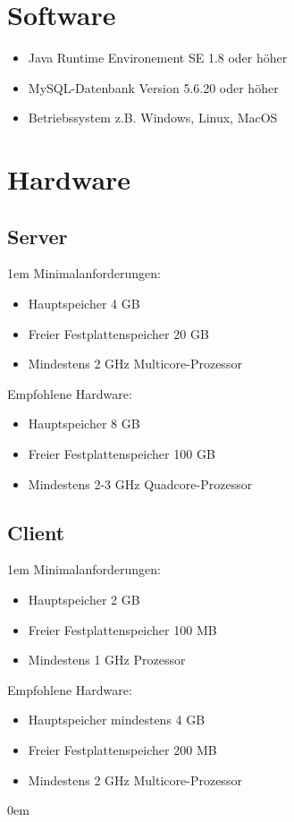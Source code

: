 \section{Software}
   \begin{itemize}
      \item Java Runtime Environement SE 1.8 oder höher
      \item MySQL-Datenbank Version 5.6.20 oder höher
      \item Betriebssystem z.B. Windows, Linux, MacOS
   \end{itemize}
\section{Hardware}
\label{sec:empfohleneHardware}
   \subsection{Server}\label{subsec:hardwareServer}
   \leftskip1em
	Minimalanforderungen:
   \begin{itemize}
   	\leftskip1em
      \item Hauptspeicher 4 GB
      \item Freier Festplattenspeicher 20 GB
      \item Mindestens 2 GHz Multicore-Prozessor
   \end{itemize}
   Empfohlene Hardware:
   \begin{itemize}
   \leftskip1em
      \item Hauptspeicher 8 GB
      \item Freier Festplattenspeicher 100 GB
      \item Mindestens 2-3 GHz Quadcore-Prozessor
   \end{itemize}
   \subsection{Client}\label{subsec:hardwareClient}
   \leftskip1em
   	Minimalanforderungen:
   \begin{itemize}
   \leftskip1em
      \item Hauptspeicher 2 GB
      \item Freier Festplattenspeicher 100 MB
      \item Mindestens 1 GHz Prozessor
   \end{itemize}
   Empfohlene Hardware:
   \begin{itemize}
   \leftskip1em
      \item Hauptspeicher mindestens 4 GB
      \item Freier Festplattenspeicher 200 MB
      \item Mindestens 2 GHz Multicore-Prozessor
   \end{itemize}
   \rightskip0em
